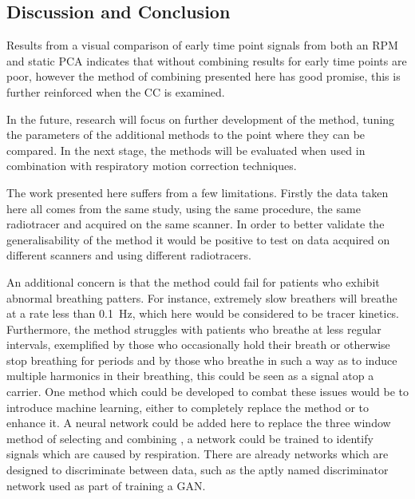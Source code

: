         \subsection{Discussion and Conclusion} \label{sec:pca_data_driven_surrogate_signal_extraction_methods_for_dynamic_pet_discussion_and_conclusion}
            Results from a visual comparison of early time point signals from both an \gls{RPM} and static \gls{PCA} indicates that without combining  results for early time points are poor, however the method of combining  presented here has good promise, this is further reinforced when the \gls{CC} is examined.
            
            In the future, research will focus on further development of the method, tuning the parameters of the additional methods to the point where they can be compared. In the next stage, the methods will be evaluated when used in combination with respiratory motion correction techniques.
            
            The work presented here suffers from a few limitations. Firstly the data taken here all comes from the same study, using the same procedure, the same radiotracer and acquired on the same scanner. In order to better validate the generalisability of the method it would be positive to test on data acquired on different scanners and using different radiotracers.
            
            An additional concern is that the method could fail for patients who exhibit abnormal breathing patters. For instance, extremely slow breathers will breathe at a rate less than \SI{0.1}{\hertz}, which here would be considered to be tracer kinetics. Furthermore, the method struggles with patients who breathe at less regular intervals, exemplified by those who occasionally hold their breath or otherwise stop breathing for periods and by those who breathe in such a way as to induce multiple harmonics in their breathing, this could be seen as a signal atop a carrier. One method which could be developed to combat these issues would be to introduce machine learning, either to completely replace the method or to enhance it. A neural network could be added here to replace the three window method of selecting and combining , a network could be trained to identify signals which are caused by respiration. There are already networks which are designed to discriminate between data, such as the aptly named discriminator network used as part of training a \gls{GAN}. 
    
